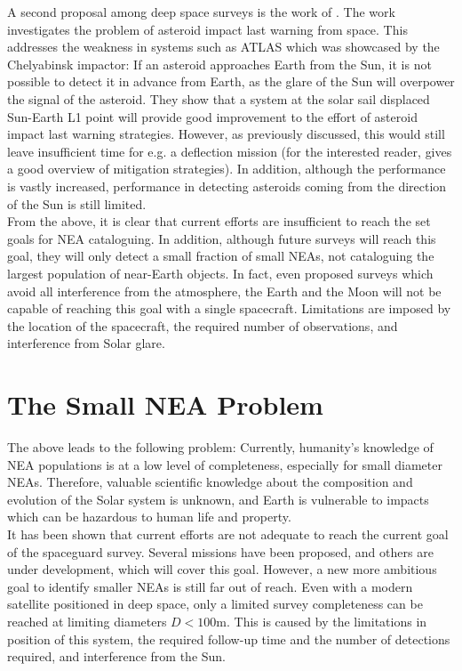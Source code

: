 A second proposal among deep space surveys is the work of \cite{ThesisOlga}. The work investigates the problem of asteroid impact last warning from space. This addresses the weakness in systems such as ATLAS which was showcased by the Chelyabinsk impactor: If an asteroid approaches Earth from the Sun, it is not possible to detect it in advance from Earth, as the glare of the Sun will overpower the signal of the asteroid. They show that a system at the solar sail displaced Sun-Earth L1 point will provide good improvement to the effort of asteroid impact last warning strategies. However, as previously discussed, this would still leave insufficient time for e.g. a deflection mission (for the interested reader, \cite{DefendingEarth} gives a good overview of mitigation strategies). In addition, although the performance is vastly increased, performance in detecting asteroids coming from the direction of the Sun is still limited.\\

From the above, it is clear that current efforts are insufficient to reach the set goals for NEA cataloguing. In addition, although future surveys will reach this goal, they will only detect a small fraction of small NEAs, not cataloguing the largest population of near-Earth objects. In fact, even proposed surveys which avoid all interference from the atmosphere, the Earth and the Moon will not be capable of reaching this goal with a single spacecraft. Limitations are imposed by the location of the spacecraft, the required number of observations, and interference from Solar glare.



\section{The Small NEA Problem}
\label{sec:problemstatement}
The above leads to the following problem: Currently, humanity's knowledge of NEA populations is at a low level of completeness, especially for small diameter NEAs. Therefore, valuable scientific knowledge about the composition and evolution of the Solar system is unknown, and Earth is vulnerable to impacts which can be hazardous to human life and property. \\

It has been shown that current efforts are not adequate to reach the current goal of the spaceguard survey. Several missions have been proposed, and others are under development, which will cover this goal. However, a new more ambitious goal to identify smaller NEAs is still far out of reach. Even with a modern satellite positioned in deep space, only a limited survey completeness can be reached at limiting diameters $D < 100 \mathrm{m}$. This is caused by the limitations in position of this system, the required follow-up time and the number of detections required, and interference from the Sun.

